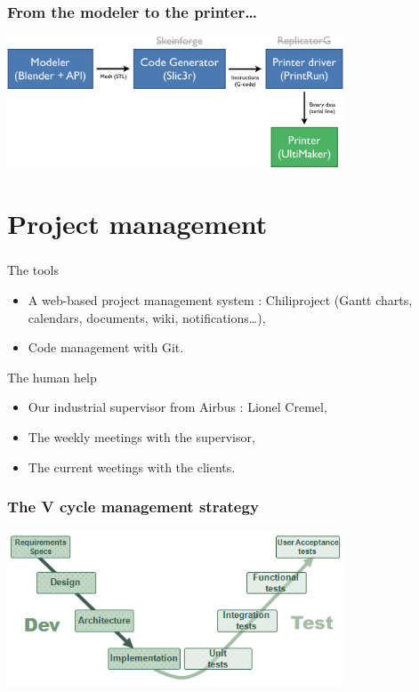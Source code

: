 \documentclass{beamer}
\begin{document}
\begin{frame}
	\frametitle{From the modeler to the printer…}

    \begin{center}
		\includegraphics[width=10cm]{schema}	
	\end{center}
	
\end{frame}

\section{Project management}

\begin{frame}
	\frametitle{}
	\begin{block}{The tools}
    \begin{itemize}
		\item A web-based project management system : Chiliproject (Gantt charts, calendars, documents, wiki, notifications\ldots ),
		\item Code management with Git.
	\end{itemize}
	\end{block}
	
	\begin{block}{The human help}
    \begin{itemize}
		\item Our industrial supervisor from Airbus : Lionel Cremel,
		\item The weekly meetings with the supervisor, 
		\item The current weetings with the clients.
	\end{itemize}
	\end{block}
\end{frame}

\begin{frame}
	\frametitle{The V cycle management strategy}
	\begin{center}
		\includegraphics[width=10cm]{VCycle}	
	\end{center}
    
\end{frame}
\end{document}
